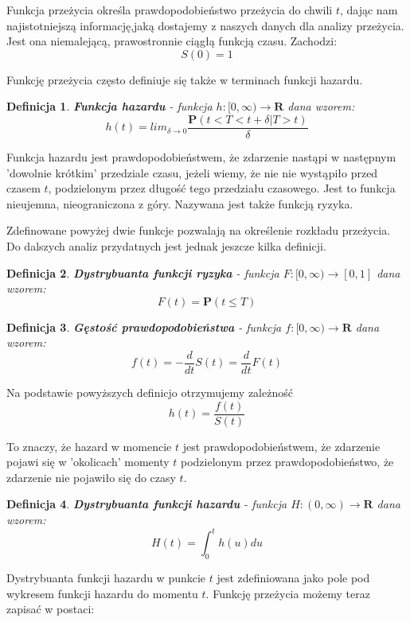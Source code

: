 \documentclass[]{pracamgr}
\newtheorem{defi}{Definicja}[section]
\begin{document}
Funkcja przeżycia określa prawdopodobieństwo przeżycia do chwili $t$, dając nam najistotniejszą informację,jaką dostajemy z naszych danych dla analizy przeżycia. Jest ona niemalejącą, prawostronnie ciągłą funkcją czasu. Zachodzi:
$$S(0) = 1$$


Funkcję przeżycia często definiuje się także w terminach funkcji hazardu.

\begin{defi}\label{hazard}
\textbf{Funkcja hazardu} - funkcja $h:[0, \infty) \to \mathbf{R}$ dana wzorem:
$$h(t) = lim_{\delta \to 0} \frac{\mathbf{P}(t<T<t+\delta|T>t)}{\delta}$$
\end{defi}

Funkcja hazardu jest prawdopodobieństwem, że zdarzenie nastąpi w następnym 'dowolnie krótkim' przedziale czasu, jeżeli wiemy, że nie nie wystąpiło przed czasem $t$, podzielonym przez długość tego przedziału czasowego. Jest to funkcja nieujemna, nieograniczona z góry. Nazywana jest także funkcją ryzyka.

Zdefinowane powyżej dwie funkcje pozwalają na określenie rozkładu przeżycia. Do dalszych analiz przydatnych jest jednak jeszcze kilka definicji.

\begin{defi}\label{cdf}
\textbf{Dystrybuanta funkcji ryzyka} - funkcja $F:[0, \infty) \to [0,1]$ dana wzorem:
$$F(t) = \mathbf{P}(t \leq T)$$
\end{defi}

\begin{defi}\label{pdf}
\textbf{Gęstość prawdopodobieństwa} - funkcja $f:[0, \infty) \to \mathbf{R}$ dana wzorem:
$$f(t) = - \frac{d}{dt}S(t) = \frac{d}{dt}F(t)$$
\end{defi}

Na podstawie powyższych definicjo otrzymujemy zależność
\begin{equation}
h(t) = \frac{f(t)}{S(t)}
\end{equation}

To znaczy, że hazard w momencie $t$ jest prawdopodobieństwem, że zdarzenie pojawi się w 'okolicach' momenty $t$ podzielonym przez prawdopodobieństwo, że zdarzenie nie pojawiło się do czasy $t$.

\begin{defi}
\textbf{Dystrybuanta funkcji hazardu} - funkcja $H:(0,\infty) \to \mathbf{R}$ dana wzorem:
$$H(t) = \int_0^t h(u)du $$
\end{defi}

Dystrybuanta funkcji hazardu w punkcie $t$ jest zdefiniowana jako pole pod wykresem funkcji hazardu do momentu $t$. Funkcję przeżycia możemy teraz zapisać w postaci:
\end{document}
